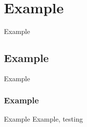 \section{Example}
Example
\subsection{Example}
Example
\subsubsection{Example}
Example
Example, testing